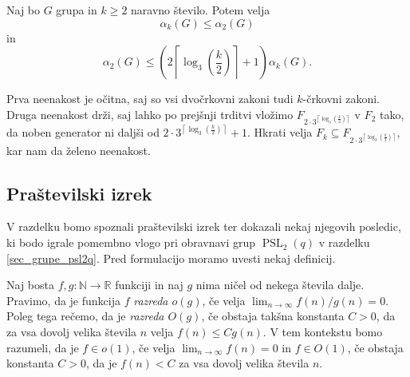 \begin{posledica}\label{psl_veccrkovni_zakoni_meje}
Naj bo $G$ grupa in $k \ge 2$ naravno število. Potem velja \begin{equation*}
     \alpha_k(G) \le  \alpha_2(G) 
\end{equation*}  
in \begin{equation*}
\alpha_2(G) \le \left( {2 \left\lceil \log_3 \left(\frac{k}{2} \right) \right\rceil + 1  } \right) \alpha_k(G).
\end{equation*}  
\end{posledica}
\begin{dokaz}
    Prva neenakost je očitna, saj so vsi dvočrkovni zakoni tudi $k$-črkovni zakoni. Druga neenakost drži, saj lahko po prejšnji trditvi vložimo $F_{2 \cdot  3^{\left\lceil \log_3 \left(\frac{k}{2} \right) \right\rceil}}$ v $F_2$
    tako, da noben generator ni daljši od ${2 \cdot  3^{\left\lceil \log_3 \left(\frac{k}{2} \right) \right\rceil } + 1 }$. Hkrati velja $F_k \subseteq F_{2 \cdot  3^{\left\lceil \log_3 \left(\frac{k}{2} \right)  \right\rceil}}$, kar nam da želeno neenakost.
\end{dokaz}

\subsection{Praštevilski izrek}

V razdelku bomo spoznali praštevilski izrek ter dokazali nekaj njegovih posledic, ki bodo igrale pomembno vlogo pri obravnavi grup $\operatorname{PSL}_2(q)$ v razdelku \ref{sec_grupe_psl2q}. Pred formulacijo moramo uvesti nekaj definicij.
\begin{definicija}
\label{def_o1_O1}
Naj bosta $f, g : \mathbb{N} \to  \mathbb{R}$ funkciji in naj $g$ nima ničel od nekega števila dalje. Pravimo, da je funkcija $f$ \emph{razreda $o(g)$}, če velja $\lim_{n \to \infty} f(n) / g(n) = 0$.
Poleg tega rečemo, da je \emph{razreda $O(g)$}, če obstaja takšna konstanta $C > 0$, da za vsa dovolj velika števila $n$ velja $f(n) \le C g(n)$.
V tem kontekstu bomo razumeli, da je $f \in o(1)$, če velja $\lim_{n \to \infty} f(n) = 0$ in $f \in O(1)$, če obstaja konstanta $C >0$, da je $f(n) < C$ za vsa dovolj velika števila $n$.
\end{definicija}

